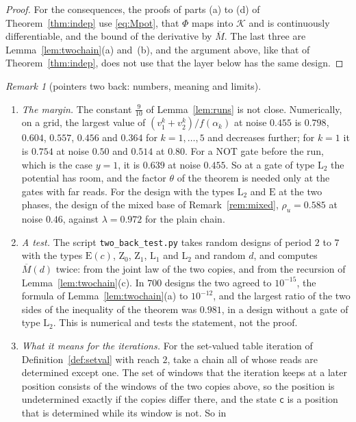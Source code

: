 \documentclass[11pt]{amsart}
\theoremstyle{definition}
\theoremstyle{remark}
\newtheorem{remark}[theorem]{Remark}
\begin{document}
\begin{proof}
For the consequences, the proofs of parts (a) to (d) of Theorem~\ref{thm:indep} use
\eqref{eq:Mpot}, that $\Phi$ maps into $\mathcal K$ and is continuously differentiable, and the
bound of the derivative by $\overline M$. The last three are Lemma~\ref{lem:twochain}(a)
and~(b), and the argument above, like that of Theorem~\ref{thm:indep}, does not use that the
layer below has the same design.
\end{proof}

\begin{remark}[pointers two back: numbers, meaning and limits]\label{rem:two}
\begin{enumerate}[label=(\roman*),leftmargin=2.4em]
\item \emph{The margin.} The constant $\frac9{10}$ of Lemma~\ref{lem:runs} is not close.
Numerically, on a grid, the largest value of $(v^k_1+v^k_2)/f(\alpha_k)$ at noise $0.455$ is
$0.798$, $0.604$, $0.557$, $0.456$ and $0.364$ for $k=1,\dots,5$ and decreases further; for
$k=1$ it is $0.754$ at noise $0.50$ and $0.514$ at $0.80$. For a NOT gate before the run, which
is the case $y=1$, it is $0.639$ at noise $0.455$. So at a gate of type $\mathrm L_2$ the
potential has room, and the factor $\theta$ of the theorem is needed only at the gates with
far reads. For the design with the types $\mathrm L_2$ and $\mathrm E$ at the two phases, the
design of the mixed base of Remark~\ref{rem:mixed}, $\rho_u=0.585$ at noise $0.46$, against
$\lambda=0.972$ for the plain chain.
\item \emph{A test.} The script \texttt{two\_back\_test.py} takes random designs of period $2$
to $7$ with the types $\mathrm E(c)$, $\mathrm Z_0$, $\mathrm Z_1$, $\mathrm L_1$ and
$\mathrm L_2$ and random $d$, and computes $\overline M(d)$ twice: from the joint law of the two
copies, and from the recursion of Lemma~\ref{lem:twochain}(c). In $700$ designs the two agreed
to $10^{-15}$, the formula of Lemma~\ref{lem:twochain}(a) to $10^{-12}$, and the largest ratio
of the two sides of the inequality of the theorem was $0.981$, in a design without a gate of
type $\mathrm L_2$. This is numerical and tests the statement, not the proof.
\item \emph{What it means for the iterations.} For the set-valued table iteration of
Definition~\ref{def:setval} with reach $2$, take a chain all of whose reads are determined
except one. The set of windows that the iteration keeps at a later position consists of the
windows of the two copies above, so the position is undetermined exactly if the copies differ
there, and the state $\mathsf c$ is a position that is determined while its window is not. So in

\end{enumerate}
\end{remark}
\end{document}
